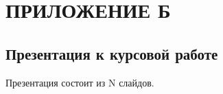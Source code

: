 \section*{ПРИЛОЖЕНИЕ Б}

\subsection*{Презентация к курсовой работе}

Презентация состоит из N слайдов.
